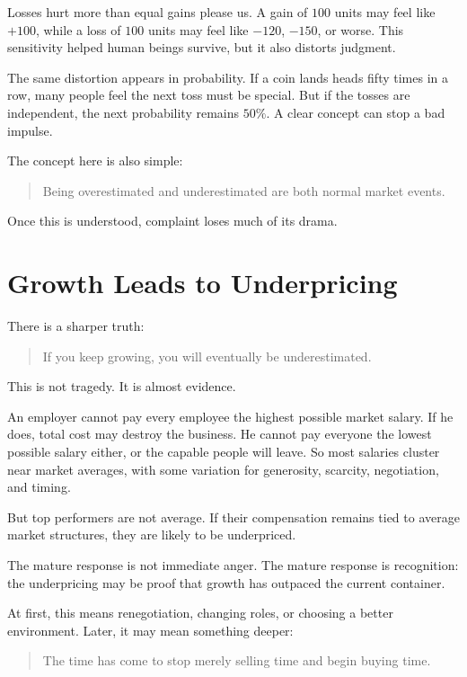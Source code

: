 Losses hurt more than equal gains please us. A gain of \(100\) units may feel like \(+100\), while a loss of \(100\) units may feel like \(-120\), \(-150\), or worse. This sensitivity helped human beings survive, but it also distorts judgment.

The same distortion appears in probability. If a coin lands heads fifty times in a row, many people feel the next toss must be special. But if the tosses are independent, the next probability remains \(50\%\). A clear concept can stop a bad impulse.

The concept here is also simple:

\begin{quote}
Being overestimated and underestimated are both normal market events.
\end{quote}

Once this is understood, complaint loses much of its drama.

\section*{Growth Leads to Underpricing}

There is a sharper truth:

\begin{quote}
If you keep growing, you will eventually be underestimated.
\end{quote}

This is not tragedy. It is almost evidence.

An employer cannot pay every employee the highest possible market salary. If he does, total cost may destroy the business. He cannot pay everyone the lowest possible salary either, or the capable people will leave. So most salaries cluster near market averages, with some variation for generosity, scarcity, negotiation, and timing.

But top performers are not average. If their compensation remains tied to average market structures, they are likely to be underpriced.

The mature response is not immediate anger. The mature response is recognition: the underpricing may be proof that growth has outpaced the current container.

At first, this means renegotiation, changing roles, or choosing a better environment. Later, it may mean something deeper:

\begin{quote}
The time has come to stop merely selling time and begin buying time.
\end{quote}

